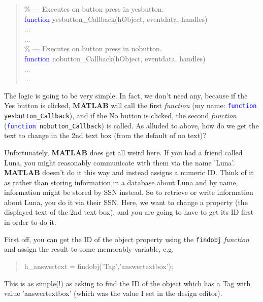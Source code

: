 \documentclass{tufte-book} %
\newenvironment{docspec}{\begin{quotation}\ttfamily\parskip0pt\parindent0pt\ignorespaces}{\end{quotation}}
\begin{document}
\begin{docspec}
\textcolor[rgb]{0,0.501961,0}{\% --- Executes on button press in yesbutton.}
\\\textcolor{blue}{function} yesbutton\_Callback(hObject, eventdata, handles)
\\...
\\...
\\\textcolor[rgb]{0,0.501961,0}{\% --- Executes on button press in nobutton.}
\\\textcolor{blue}{function} nobutton\_Callback(hObject, eventdata, handles)
\\...
\\...
\end{docspec}

The logic is going to be very simple. In fact, we don't need any, because if the Yes button is clicked, \textbf{MATLAB} will call the first \textit{function} (my name: \texttt{\textcolor{blue}{function} yesbutton\_Callback}), and if the No button is clicked, the second \textit{function} (\texttt{\textcolor{blue}{function} nobutton\_Callback}) is called. As alluded to above, how do we get the text to change in the 2nd text box (from the default of no text)?

Unfortunately, \textbf{MATLAB} does get all weird here. If you had a friend called Luna, you might reasonably communicate with them via the name 'Luna'. \textbf{MATLAB} doesn't do it this way and instead assigns a numeric ID. Think of it as rather than storing information in a database about Luna and by name, information might be stored by SSN instead. So to retrieve or write information about Luna, you do it via their SSN. Here, we want to change a property (the displayed text  of the 2nd text box), and you are going to have to get its ID first in order to do it.

First off, you can get the ID of the object property using the \texttt{findobj} \textit{function} and assign the result to some memorably variable, e.g.
\begin{docspec}
h\_answertext = findobj('Tag','answertextbox');
\end{docspec}
This is as simple(!) as asking to find the ID of the object which has a \textsf{Tag} with value '\textsf{answertextbox}' (which was the value I set in the design editor). 
\end{document}

